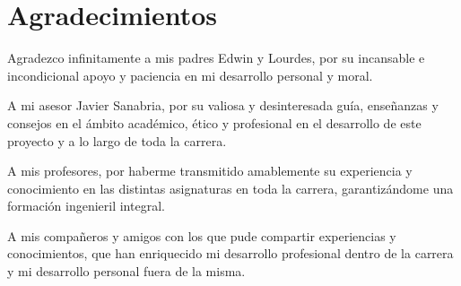 \chapter*{Agradecimientos} %
 
Agradezco infinitamente a mis padres Edwin y Lourdes,
por su incansable e incondicional apoyo y paciencia en mi desarrollo personal y moral.

\vspace{1cm}

A mi asesor Javier Sanabria, por su valiosa y desinteresada guía, 
enseñanzas y consejos en el ámbito académico, ético y profesional 
en el desarrollo de este proyecto y a lo largo de toda la carrera.

\vspace{1cm}

A mis profesores, por haberme transmitido amablemente su experiencia y conocimiento 
en las distintas asignaturas en toda la carrera, garantizándome una formación ingenieril integral.

\vspace{1cm}

A mis compañeros y amigos con los que pude compartir experiencias y conocimientos, que han enriquecido 
mi desarrollo profesional dentro de la carrera y mi desarrollo personal fuera de la misma.